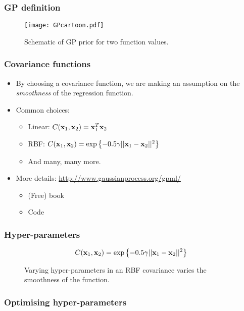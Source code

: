 \begin{frame}
	\frametitle{GP definition}
	\begin{figure}[tbh]
		\texttt{[image: GPcartoon.pdf]}		
		\centering\caption{\label{fig:GPcartoon}Schematic of GP prior for two function values.}
	\end{figure}
\end{frame}


\begin{frame}
	\frametitle{Covariance functions}
	\begin{itemize}
		\item By choosing a covariance function, we are making an assumption on the \emph{smoothness} of the regression function.
		\item Common choices:
		\begin{itemize}
			\item Linear: $C(\mathbf{x}_1,\mathbf{x}_2) = \mathbf{x}_1^T\mathbf{x}_2$
			\item RBF: $C(\mathbf{x}_1,\mathbf{x}_2) = \exp\left\{-0.5\gamma ||\mathbf{x}_1 - \mathbf{x}_2||^2 \right\}$
			\item And many, many more.
		\end{itemize}
		\item More details: \url{http://www.gaussianprocess.org/gpml/}
		\begin{itemize}
			\item (Free) book
			\item Code
		\end{itemize}
	\end{itemize}
\end{frame}

\begin{frame}
	\frametitle{Hyper-parameters}
	\[
C(\mathbf{x}_1,\mathbf{x}_2) = \exp\left\{-0.5\gamma ||\mathbf{x}_1 - \mathbf{x}_2||^2 \right\}
	\]
	\begin{figure}[tbh]
		\centering\caption{\label{fig:hyper}Varying hyper-parameters in an RBF covariance varies the smoothness of the function.}
	\end{figure}
\end{frame}

\begin{frame}
	\frametitle{Optimising hyper-parameters}
	
\end{frame}

